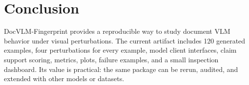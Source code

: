 \documentclass{article}
\begin{document}
\section{Conclusion}

DocVLM-Fingerprint provides a reproducible way to study document VLM behavior under visual perturbations. The current artifact includes 120 generated examples, four perturbations for every example, model client interfaces, claim support scoring, metrics, plots, failure examples, and a small inspection dashboard. Its value is practical: the same package can be rerun, audited, and extended with other models or datasets.


\end{document}
